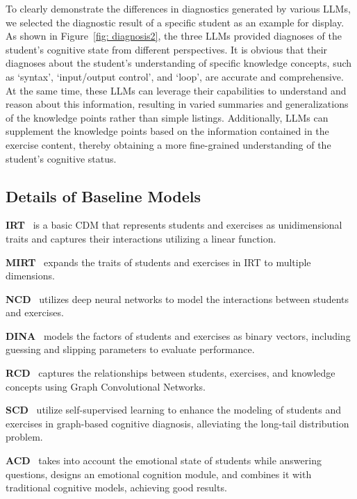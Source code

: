 To clearly demonstrate the differences in diagnostics generated by various LLMs, we selected the diagnostic result of a specific student as an example for display.
As shown in Figure~\ref{fig: diagnosis2}, the three LLMs provided diagnoses of the student's cognitive state from different perspectives.
It is obvious that their diagnoses about the student's understanding of specific knowledge concepts, such as `syntax', `input/output control', and `loop', are accurate and comprehensive. 
At the same time, these LLMs can leverage their capabilities to understand and reason about this information, resulting in varied summaries and generalizations of the knowledge points rather than simple listings. Additionally, LLMs can supplement the knowledge points based on the information contained in the exercise content, thereby obtaining a more fine-grained understanding of the student's cognitive status.


\subsection{Details of Baseline Models}
\noindent\textbf{IRT}~\cite{lord1952theory} is a basic CDM that represents students and exercises as unidimensional traits and captures their interactions utilizing a linear function.

\noindent\textbf{MIRT}~\cite{reckase200618} expands the traits of students and exercises in IRT to multiple dimensions.

\noindent\textbf{NCD}~\cite{wang2020neural} utilizes deep neural networks to model the interactions between students and exercises.

\noindent\textbf{DINA}~\cite{de2009dina} models the factors of students and exercises as binary vectors, including guessing and slipping parameters to evaluate performance.


\noindent\textbf{RCD}~\cite{gao2021rcd} captures the relationships between students, exercises, and knowledge concepts using Graph Convolutional Networks.

\noindent\textbf{SCD}~\cite{wang2023self} utilize self-supervised learning to enhance the modeling of students and exercises in graph-based cognitive diagnosis, alleviating the long-tail distribution problem.

\noindent\textbf{ACD}~\cite{wang2024boosting} takes into account the emotional state of students while answering questions, designs an emotional cognition module, and combines it with traditional cognitive models, achieving good results.